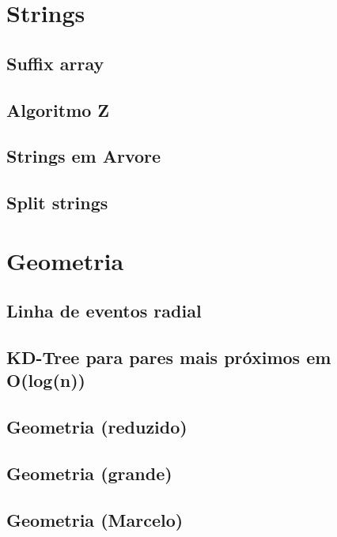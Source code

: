 \section{Strings}
\subsection{Suffix array}
\raggedbottom
\clearpage
\subsection{Algoritmo Z}
\raggedbottom
\clearpage
\subsection{Strings em Arvore}
\raggedbottom
\clearpage
\subsection{Split strings}
\raggedbottom
\clearpage
\clearpage
\section{Geometria}
\subsection{Linha de eventos radial}
\raggedbottom
\clearpage
\subsection{KD-Tree para pares mais próximos em O(log(n))}
\raggedbottom
\clearpage
\subsection{Geometria (reduzido)}
\raggedbottom
\clearpage
\subsection{Geometria (grande)}
\raggedbottom
\clearpage
\subsection{Geometria (Marcelo)}
\raggedbottom
\clearpage
\clearpage
